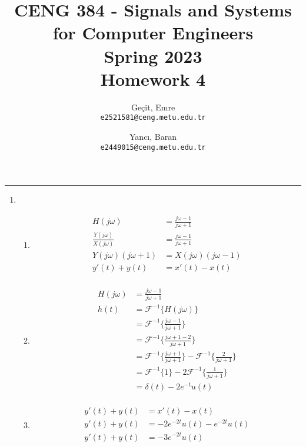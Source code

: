 \documentclass[10pt,a4paper, margin=1in]{article}
\author{
  Geçit, Emre\\
  \texttt{e2521581@ceng.metu.edu.tr}
  \and
  Yancı, Baran\\
  \texttt{e2449015@ceng.metu.edu.tr}
}
\title{CENG 384 - Signals and Systems for Computer Engineers \\
Spring 2023 \\
Homework 4}
\begin{document}
\maketitle



\noindent\rule{19cm}{1.2pt}

\begin{enumerate}

\item %
	\begin{enumerate}   
    \item %
    \begin{align*}
        H(j\omega) &= \frac{j\omega - 1}{j\omega + 1} \\
        \frac{Y(j\omega)}{X(j\omega)} &= \frac{j\omega - 1}{j\omega + 1} \\
        Y(j\omega)(j\omega + 1) &= X(j\omega)(j\omega - 1) \\
        y'(t) + y(t) &= x'(t) - x(t) \\
    \end{align*}
    \item %
    \begin{align*}
        H(j\omega) &= \frac{j\omega - 1}{j\omega + 1} \\
        h(t) &= \mathcal{F}^{-1}\{H(j\omega)\} \\
        &= \mathcal{F}^{-1}\{\frac{j\omega - 1}{j\omega + 1}\} \\
        &= \mathcal{F}^{-1}\{\frac{j\omega + 1 - 2}{j\omega + 1}\} \\
        &= \mathcal{F}^{-1}\{\frac{j\omega + 1}{j\omega + 1}\} - \mathcal{F}^{-1}\{\frac{2}{j\omega + 1}\} \\
        &= \mathcal{F}^{-1}\{1\} - 2\mathcal{F}^{-1}\{\frac{1}{j\omega + 1}\} \\
        &= \delta(t) - 2e^{-t}u(t) \\
    \end{align*}
	\item %
    \begin{align*}
        y'(t) + y(t) &= x'(t) - x(t) \\
        y'(t) + y(t) &= -2e^{-2t}u(t) - e^{-2t}u(t) \\
        y'(t) + y(t) &= -3e^{-2t}u(t) \\

\end{align*}
\end{enumerate}
\end{enumerate}
\end{document}
